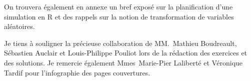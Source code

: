 On trouvera également en annexe un bref exposé sur la planification
d'une simulation en R et des rappels sur la notion de transformation
de variables aléatoires.

Je tiens à souligner la précieuse collaboration de MM.~Mathieu
Boudreault, Sébastien Auclair et Louis-Philippe Pouliot lors de la
rédaction des exercices et des solutions. Je remercie également
Mmes~Marie-Pier Laliberté et Véronique Tardif pour l'infographie des
pages couvertures.

